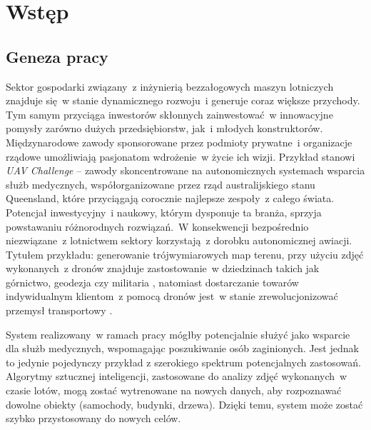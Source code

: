 \chapter{Wstęp} \label{chapter_intro}


\section{Geneza pracy} \label{intro_genesis}

Sektor gospodarki związany~z inżynierią bezzałogowych maszyn lotniczych znajduje się~w
stanie dynamicznego rozwoju~i generuje coraz większe przychody.
Tym samym przyciąga inwestorów skłonnych zainwestować~w innowacyjne pomysły zarówno 
dużych przedsiębiorstw, jak~i młodych konstruktorów. Międzynarodowe zawody sponsorowane
przez podmioty prywatne~i organizacje rządowe umożliwiają pasjonatom wdrożenie~w życie
ich wizji. Przykład stanowi \textit{UAV Challenge} -- zawody skoncentrowane na
autonomicznych systemach wsparcia służb medycznych, współorganizowane przez rząd
australijskiego stanu Queensland, które przyciągają corocznie najlepsze zespoły~z całego
świata\cite{uav_sponsors}. Potencjał inwestycyjny~i naukowy, którym dysponuje ta branża,
sprzyja powstawaniu różnorodnych rozwiązań.~W konsekwencji bezpośrednio niezwiązane~z lotnictwem sektory korzystają~z dorobku autonomicznej awiacji.
Tytułem przykładu: generowanie trójwymiarowych map terenu, przy użyciu zdjęć wykonanych~z dronów znajduje
zastostowanie~w dziedzinach takich jak górnictwo, geodezja czy militaria
\cite{uav_photogrametry}, natomiast dostarczanie towarów indywidualnym klientom~z pomocą
dronów jest~w stanie zrewolucjonizować przemysł transportowy \cite{prime_air}.


System realizowany~w ramach pracy mógłby potencjalnie służyć jako wsparcie dla służb
medycznych, wspomagając poszukiwanie osób zaginionych. Jest jednak to jedynie pojedynczy 
przykład z szerokiego spektrum potencjalnych zastosowań. Algorytmy sztucznej inteligencji,
zastosowane do analizy zdjęć wykonanych~w czasie lotów, mogą zostać wytrenowane
na nowych danych, aby rozpoznawać dowolne obiekty (samochody, budynki, drzewa). 
Dzięki temu, system może zostać szybko przystosowany do nowych celów.

